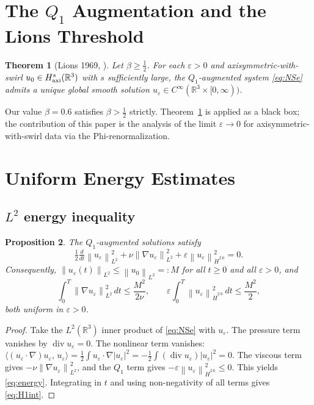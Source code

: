 \documentclass{article}
\newtheorem{theorem}{Theorem}[section]
\newtheorem{proposition}[theorem]{Proposition}
\theoremstyle{definition}
\theoremstyle{remark}
\newcommand{\R}{\mathbb{R}}
\newcommand{\e}{\varepsilon}
\newcommand{\half}{\tfrac{1}{2}}
\newcommand{\norm}[1]{\left\|#1\right\|}
\newcommand{\inner}[2]{\langle #1,\, #2\rangle}
\newcommand{\ddt}{\tfrac{d}{dt}}
\begin{document}
\section{The \texorpdfstring{$Q_1$}{Q1} Augmentation
  and the Lions Threshold}\label{sec:Q1}

\begin{theorem}[Lions 1969, \cite{Lions1969}]\label{thm:lions}
  Let $\beta \ge \tfrac{1}{2}$.  For each $\e > 0$ and
  axisymmetric-with-swirl $u_0\in H^s_{\rm axi}(\R^3)$ with $s$
  sufficiently large, the $Q_1$-augmented system \eqref{eq:NSe} admits a
  unique global smooth solution $u_\e \in C^\infty(\R^3\times[0,\infty))$.
\end{theorem}

Our value $\beta = 0.6$ satisfies $\beta > \tfrac{1}{2}$ strictly.
Theorem~\ref{thm:lions} is applied as a black box; the contribution of
this paper is the analysis of the limit $\e\to 0$ for axisymmetric-with-swirl
data via the Phi-renormalization.

\section{Uniform Energy Estimates}\label{sec:energy}

\subsection{\texorpdfstring{$L^2$}{L2} energy inequality}

\begin{proposition}\label{prop:L2}
  The $Q_1$-augmented solutions satisfy
  \begin{equation}\label{eq:energy}
    \half\ddt\norm{u_\e}_{L^2}^2
    + \nu\norm{\nabla u_\e}_{L^2}^2
    + \e\norm{u_\e}_{\dot H^{2.6}}^2 = 0.
  \end{equation}
  Consequently, $\norm{u_\e(t)}_{L^2} \le \norm{u_0}_{L^2} =: M$
  for all $t\ge 0$ and all $\e > 0$, and
  \begin{equation}\label{eq:H1int}
    \int_0^T\norm{\nabla u_\e}_{L^2}^2\,dt \le \frac{M^2}{2\nu},
    \qquad
    \e\int_0^T\norm{u_\e}_{\dot H^{2.6}}^2\,dt \le \frac{M^2}{2},
  \end{equation}
  both uniform in $\e > 0$.
\end{proposition}
\begin{proof}
  Take the $L^2(\R^3)$ inner product of \eqref{eq:NSe} with $u_\e$.
  The pressure term vanishes by $\operatorname{div}u_\e = 0$.  The
  nonlinear term vanishes:
  $\inner{(u_\e\cdot\nabla)u_\e}{u_\e} = \half\int u_\e\cdot\nabla|u_\e|^2
  = -\half\int(\operatorname{div}u_\e)|u_\e|^2 = 0$.
  The viscous term gives $-\nu\norm{\nabla u_\e}_{L^2}^2$, and the
  $Q_1$ term gives $-\e\norm{u_\e}_{\dot H^{2.6}}^2 \le 0$.
  This yields \eqref{eq:energy}.  Integrating in $t$ and using
  non-negativity of all terms gives \eqref{eq:H1int}.
\end{proof}
\end{document}
